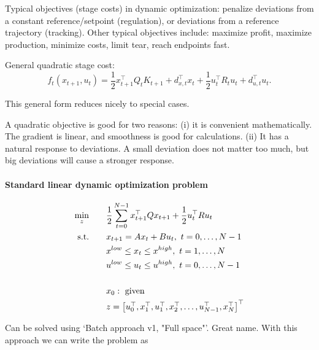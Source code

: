 \documentclass{article}
\begin{document}
\begin{center}
\end{center}

Typical objectives (stage costs) in dynamic optimization: penalize deviations from a constant reference/setpoint (regulation), or deviations from a reference trajectory (tracking).
Other typical objectives include: maximize profit, maximize production, minimize costs, limit tear, reach endpoints fast.

\medskip General quadratic stage cost:
\[
  f_t(x_{t+1}, u_t) = \frac{1}{2} x_{t+1}^{\top}Q_t K_{t+1} + d_{x, t}^{\top} x_t + \frac{1}{2} u_t^{\top}R_t u_t + d_{u,t}^{\top} u_t
.\] 

This general form reduces nicely to special cases. 

\medskip A quadratic objective is good for two reasons: (i) it is convenient mathematically. The gradient is linear, and smoothness is good for calculations. 
(ii) It has a natural response to deviations. A small deviation does not matter too much, but big deviations will cause a stronger response. 

\paragraph{Standard linear dynamic optimization problem}
\begin{align*}
  \min_z \qquad& \frac{1}{2} \sum_{t = 0}^{N-1}x_{t+1}^{\top}Qx_{t+1} + \frac{1}{2}u_t^{\top}R u_t \\ 
  \text{s.t.} \qquad& x_{t+1} = Ax_t + Bu_t,\  t = 0,\dots,N-1 \\
  & x^{low}\leq x_t \leq x^{high},\  t = 1,\dots,N \\ 
  & u^{low}\leq u_t \leq u^{high} ,\ t = 0,\dots,N-1 \\\\
  & x_0: \text{ given} \\
  & z = \begin{bmatrix} u_0^{\top}, x_1^{\top}, u_1^{\top}, x_2^{\top},\dots,u_{N-1}^{\top}, x_N^{\top} \end{bmatrix}^{\top}
\end{align*}

Can be solved using `Batch approach v1, "Full space"'. Great name. With this approach we can write the problem as
\end{document}
